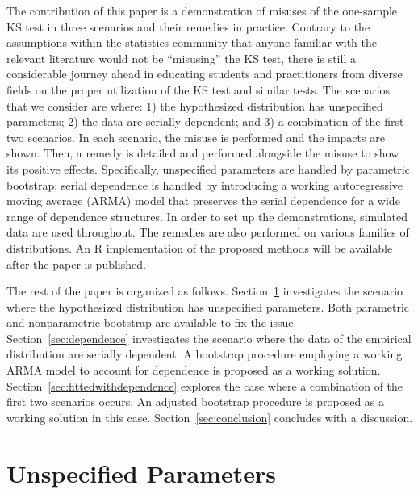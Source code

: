\documentclass[12pt, letterpaper]{article}
\begin{document}
The contribution of this paper is a demonstration of misuses of the one-sample
KS test in three scenarios and their remedies in practice. Contrary to the
assumptions within the statistics community that anyone familiar with the
relevant literature would not be ``misusing'' the KS test, there is still a
considerable journey ahead in educating students and practitioners from diverse
fields on the proper utilization of the KS test and similar tests. The scenarios
that we consider are where:
1) the hypothesized distribution has unspecified parameters;
2) the data are serially dependent; and
3) a combination of the first two scenarios.
In each scenario, the misuse is performed and the impacts are shown. Then, a
remedy is detailed and performed alongside the misuse to show its positive
effects. Specifically, unspecified parameters are handled by parametric
bootstrap; serial dependence is handled by introducing a working autoregressive
moving average (ARMA) model that preserves the serial dependence for a wide
range of dependence structures.
In order to set up the demonstrations, simulated data are used
throughout. The remedies are also performed on various families of
distributions. An R implementation of the proposed methods will be available
after the paper is published.


The rest of the paper is organized as follows. Section~\ref{sec:fitted}
investigates the scenario where the hypothesized distribution has unspecified
parameters. Both parametric and nonparametric bootstrap are available to fix the
issue. Section~\ref{sec:dependence} investigates the scenario where the data of
the empirical distribution are serially dependent. A bootstrap procedure
employing a working ARMA model to account for dependence is proposed as a
working solution. Section~\ref{sec:fittedwithdependence}
explores the case where a combination of the first two scenarios occurs. An  
adjusted bootstrap procedure is proposed as a working solution in this case.  
Section~\ref{sec:conclusion} concludes with a discussion.


\section{Unspecified Parameters}
\label{sec:fitted}
\end{document}
